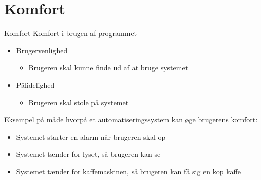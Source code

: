\section{Komfort}
\begin{frame}{Komfort}{}
Komfort i brugen af programmet
\begin{itemize}
\item Brugervenlighed
\begin{itemize}
\item Brugeren skal kunne finde ud af at bruge systemet
\end{itemize}
\item Pålidelighed
\begin{itemize}
\item Brugeren skal stole på systemet
\end{itemize}
\end{itemize}
Eksempel på måde hvorpå et automatiseringssystem kan øge brugerens komfort:
\begin{itemize}
\item Systemet starter en alarm når brugeren skal op
\item Systemet tænder for lyset, så brugeren kan se
\item Systemet tænder for kaffemaskinen, så brugeren kan få sig en kop kaffe
\end{itemize}
\end{frame}